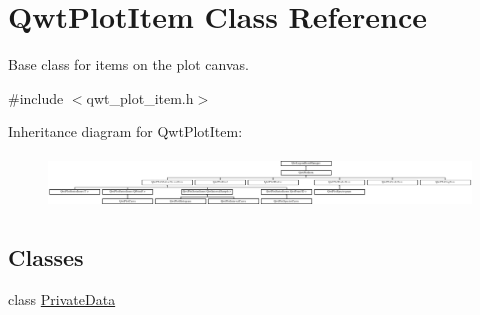 \hypertarget{class_qwt_plot_item}{\section{Qwt\-Plot\-Item Class Reference}
\label{class_qwt_plot_item}
}


Base class for items on the plot canvas.  




{\ttfamily \#include $<$qwt\-\_\-plot\-\_\-item.\-h$>$}

Inheritance diagram for Qwt\-Plot\-Item\-:\begin{figure}[H]
\begin{center}
\leavevmode
\includegraphics[height=1.400000cm]{class_qwt_plot_item}
\end{center}
\end{figure}
\subsection*{Classes}
\begin{DoxyCompactItemize}
\item 
class \hyperlink{class_qwt_plot_item_1_1_private_data}{Private\-Data}
\end{DoxyCompactItemize}
